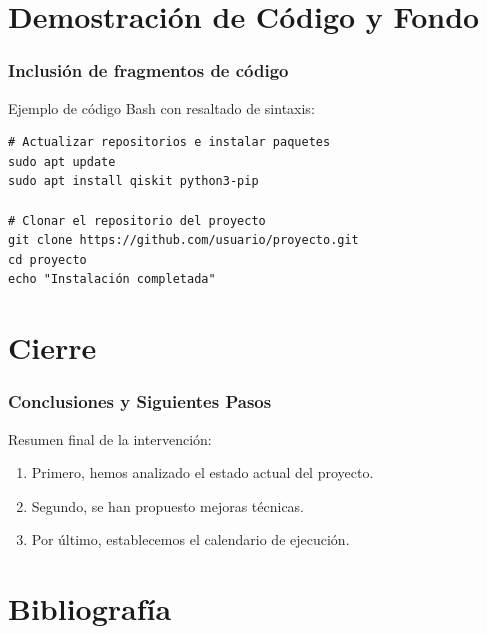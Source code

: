 \documentclass[aspectratio=169]{beamer} %
\begin{document}
\section{Demostración de Código y Fondo}

\desactivarfondo

\begin{frame}[fragile]
\frametitle{Inclusión de fragmentos de código}
Ejemplo de código Bash con resaltado de sintaxis:

\vspace{0.3cm}
\begin{lstlisting}[style=terminal]
# Actualizar repositorios e instalar paquetes
sudo apt update
sudo apt install qiskit python3-pip

# Clonar el repositorio del proyecto
git clone https://github.com/usuario/proyecto.git
cd proyecto
echo "Instalación completada"
\end{lstlisting}
\end{frame}


\section{Cierre}
\activarlogoradiante{}
\begin{frame}
\frametitle{Conclusiones y Siguientes Pasos}
Resumen final de la intervención:
\begin{enumerate}
    \item Primero, hemos analizado el estado actual del proyecto.
    \item Segundo, se han propuesto mejoras técnicas.
    \item Por último, establecemos el calendario de ejecución.
\end{enumerate}
\end{frame}
\desactivarlogoradiante{}
\section{Bibliografía}
\end{document}

